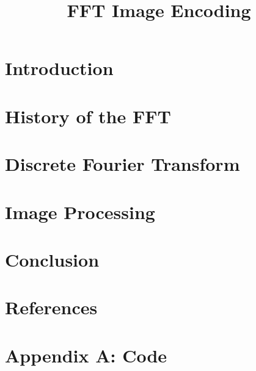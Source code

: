 \documentclass[sigplan]{acmart}
\title{FFT Image Encoding}
\begin{document}
  \maketitle

  \section{Introduction}
	

  \section{History of the FFT}
	

  \section{Discrete Fourier Transform}
	

  \section{Image Processing}
	

  \section{Conclusion}
	

  \section{References}
	

	\onecolumn\newpage
	\section{Appendix A: Code}
	
\end{document}
